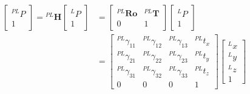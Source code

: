     \begin{equation}
        \label{eqn:homogeneous}
        \begin{aligned}
        {\left[\begin{array}{c}
        { }^{P L} P \\
        1
        \end{array}\right]={ }^{P L} \boldsymbol{H}\left[\begin{array}{c}
        { }^{L} P \\
        1
        \end{array}\right] } &=\left[\begin{array}{cc}
        { }^{P L} \boldsymbol{R} \boldsymbol{o} & { }^{P L} \boldsymbol{T} \\
        0 & 1
        \end{array}\right]\left[\begin{array}{c}
        { }^{L} P \\
        1
        \end{array}\right] \\
        &=\left[\begin{array}{cccc}
        { }^{P L} \gamma_{11} & { }^{P L} \gamma_{12} & { }^{P L} \gamma_{13} & { }^{P L} {t}_{x} \\
        { }^{P L} \gamma_{21} & ^{P L } \gamma_{22} & { }^{P L} \gamma_{23} & { }^{P L} {t}_{y} \\
        { }^{P L} \gamma_{31} & ^{P L} \gamma_{32} & { }^{P L} \gamma_{33} & { }^{P L} {t}_{z} \\
        0 & 0 & 0 & 1
        \end{array}\right]\left[\begin{array}{c}
        { }^{L} {x} \\
        { }^{L} {y} \\
        { }^{L} z \\
        1
        \end{array}\right]
        \end{aligned}
    \end{equation}


